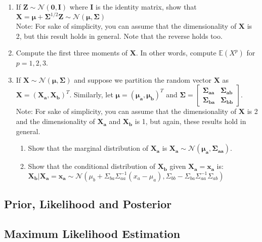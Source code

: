 \begin{enumerate}
\item If $\mathbf{Z} \sim \mathcal{N}(\mathbf{0}, \mathbf{I})$ where $\mathbf{I}$ is the identity matrix, show that $\mathbf{X} = \mathbf{\mu}+ \mathbf{\Sigma}^{1/2}\mathbf{Z} \sim \mathcal{N}(\mathbf{\mu}, \mathbf{\Sigma})$
\\Note: For sake of simplicity, you can assume that the dimensionality of $\mathbf{X}$ is 2, but this result holds in general. Note that the reverse holds too.
\item Compute the first three moments of $\mathbf{X}$. In other words, compute $\mathbb{E}(X^p)$ for $p = 1, 2, 3$.
\item If $\mathbf{X} \sim \mathcal{N}(\mathbf{\mu}, \mathbf{\Sigma})$ and suppose we partition the random vector $\mathbf{X}$ as $\mathbf{X} = \left(\mathbf{X_a}, \mathbf{X_b}\right)^T$. Similarly, let $\mathbf{\mu} = \left(\mathbf{\mu_a}, \mathbf{\mu_b}\right)^T$ and $\mathbf{\Sigma} = \begin{bmatrix}
    \mathbf{\Sigma_{aa}} & \mathbf{\Sigma_{ab}} \\
    \mathbf{\Sigma_{ba}} & \mathbf{\Sigma_{bb}}
\end{bmatrix}$.
\\Note: For sake of simplicity, you can assume that the dimensionality of $\mathbf{X}$ is 2 and the dimensionality of $\mathbf{X_a}$ and $\mathbf{X_b}$ is 1, but again, these results hold in general.
\begin{enumerate}
\item Show that the marginal distribution of $\mathbf{X_a}$ is $\mathbf{X_a} \sim \mathcal{N}(\mathbf{\mu_a}, \mathbf{\Sigma_{aa}})$.
\item Show that the conditional distribution of $\mathbf{X_b}$ given $\mathbf{X_a} = \mathbf{x_a}$ is:\\ $\mathbf{X_b}|\mathbf{X_a} = \mathbf{x_a} \sim \mathcal{N}(\mu_b+\Sigma_{ba}\Sigma_{aa}^{-1}(x_a-\mu_a), \Sigma_{bb}-\Sigma_{ba}\Sigma_{aa}^{-1}\Sigma_{ab})$
\end{enumerate}
\end{enumerate}

\subsection{Prior, Likelihood and Posterior}

\subsection{Maximum Likelihood Estimation}